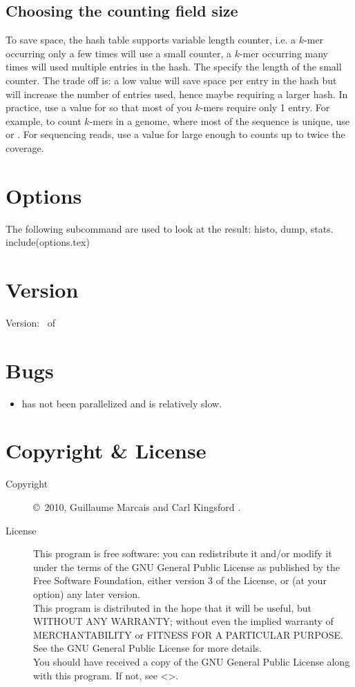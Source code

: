 \documentclass[english]{article}
\begin{document}
\subsection{Choosing the counting field size}
To save space, the hash table supports variable length counter, i.e. a
$k$-mer occurring only a few times will use a small counter, a $k$-mer
occurring many times will used multiple entries in the hash. The
 specify the length of the small counter. The trade off is: a
low value will save space per entry in the hash but will increase the
number of entries used, hence maybe requiring a larger hash. In
practice, use a value for  so that most of you $k$-mers
require only 1 entry. For example, to count $k$-mers in a genome,
where most of the sequence is unique, use  or
. For sequencing reads, use a value for
 large enough to counts up to twice the coverage.

\section{Options}
The following subcommand are used to look at the result: histo, dump, stats.
include(options.tex)
\section{Version}

Version: \Version\ of \Date

\section{Bugs}

\begin{itemize}
\item {} has not been parallelized and is
  relatively slow.
\end{itemize}

\section{Copyright \& License}
\begin{description}
\item[Copyright] \copyright\ 2010, Guillaume Marcais  and Carl Kingsford .

\item[License] This program is free software: you can redistribute it
  and/or modify it under the terms of the GNU General Public License
  as published by the Free Software Foundation, either version 3 of
  the License, or (at your option) any later version. \\
  This program is distributed in the hope that it will be useful, but
  WITHOUT ANY WARRANTY; without even the implied warranty of
  MERCHANTABILITY or FITNESS FOR A PARTICULAR PURPOSE.  See the GNU
  General Public License for more details. \\
  You should have received a copy of the GNU General Public License
  along with this program.  If not, see
  <>.
\end{description}
\end{document}
